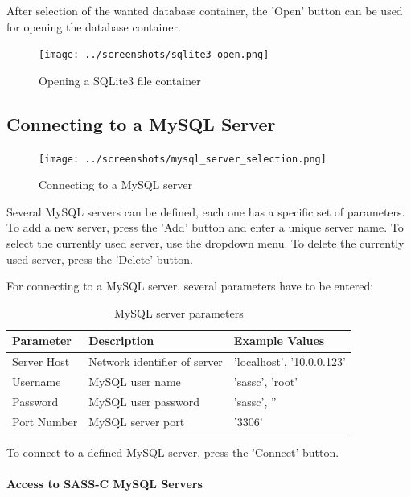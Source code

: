 After selection of the wanted database container, the 'Open' button can be used for opening the database container.

\begin{figure}[H]
  \center
    \texttt{[image: ../screenshots/sqlite3\_open.png]}
  \caption{Opening a SQLite3 file container}
  \label{fig:sqlite3_open}
\end{figure} 


\subsection{Connecting to a MySQL Server}
\label{sec:mysql_connect}

\begin{figure}[H]
  \center
    \texttt{[image: ../screenshots/mysql\_server\_selection.png]}
  \caption{Connecting to a MySQL server}
  \label{fig:mysql_connect}
\end{figure}

Several MySQL servers can be defined, each one has a specific set of parameters. To add a new server, press the 'Add' button and enter a unique server name. To select the currently used server, use the dropdown menu. To delete the currently used server, press the 'Delete' button.

For connecting to a MySQL server, several parameters have to be entered:

\begin{table}[H]
  \center
  \begin{tabular}{ | l | l | l |}
    \hline
    \textbf{Parameter} & \textbf{Description} & \textbf{Example Values} \\ \hline
    Server Host & Network identifier of server & 'localhost', '10.0.0.123' \\ \hline
    Username & MySQL user name & 'sassc', 'root' \\ \hline
    Password & MySQL user password & 'sassc', '' \\ \hline
    Port Number & MySQL server port & '3306' \\
    \hline
  \end{tabular}
  \caption{MySQL server parameters}
\end{table}

To connect to a defined MySQL server, press the 'Connect' button.\\

\paragraph{Access to SASS-C MySQL Servers}


